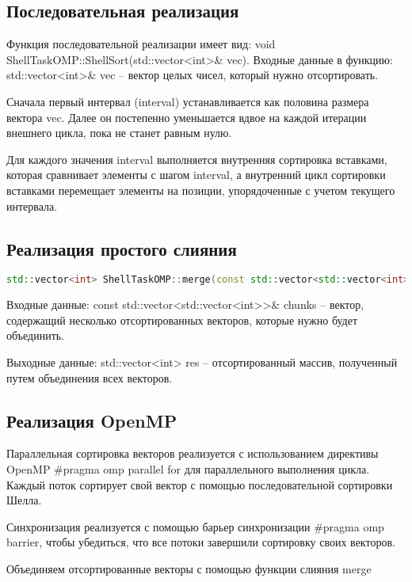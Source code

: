\documentclass[]{article}
\theoremstyle{remark}
\theoremstyle{definition}
\newcommand{\cpp}{\textit{}}
\begin{document}
\subsection{Последовательная реализация}

\par Функция последовательной реализации имеет вид: \cpp{void ShellTaskOMP::ShellSort(std::vector<int>\& vec)}. Входные данные в функцию: \cpp{std::vector<int>\& vec} -- вектор целых чисел, который нужно отсортировать.
\par Сначала первый интервал (\cpp{interval}) устанавливается как половина размера вектора \cpp{vec}. Далее он постепенно уменьшается вдвое на каждой итерации внешнего цикла, пока не станет равным нулю.
\par Для каждого значения \cpp{interval} выполняется внутренняя сортировка вставками, которая сравнивает элементы с шагом \cpp{interval}, а внутренний цикл сортировки вставками перемещает элементы на позиции, упорядоченные с учетом текущего интервала.


\subsection{Реализация простого слияния}

\begin{lstlisting}[language=C++]
std::vector<int> ShellTaskOMP::merge(const std::vector<std::vector<int>>& chunks)
\end{lstlisting}

\par Входные данные: \cpp{const std::vector<std::vector<int>>\& chunks} -- вектор, содержащий несколько отсортированных векторов, которые нужно будет объединить.

\par Выходные данные: \cpp{std::vector<int> res} -- отсортированный массив, полученный путем объединения всех векторов.


\subsection{Реализация OpenMP}

\par Параллельная сортировка векторов реализуется с использованием директивы OpenMP \cpp{\#pragma omp parallel for} для параллельного выполнения цикла. Каждый поток сортирует свой вектор с помощью последовательной сортировки Шелла.
\par Синхронизация реализуется с помощью барьер синхронизации \cpp{\#pragma omp barrier}, чтобы убедиться, что все потоки завершили сортировку своих векторов.
\par  Объединяем отсортированные векторы с помощью функции слияния \cpp{merge}
\end{document}
